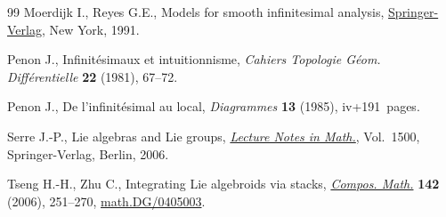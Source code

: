 \begin{thebibliography}{99}
Moerdijk I., Reyes G.E., Models for smooth inf\/initesimal analysis,
 \href{https://doi.org/10.1007/978-1-4757-4143-8}{Springer-Verlag}, New York, 1991.

Penon J., Inf\/init\'esimaux et intuitionnisme, \textit{Cahiers Topologie G\'eom.
 Diff\'erentielle} \textbf{22} (1981), 67--72.

Penon J., De l'inf\/init\'esimal au local, \textit{Diagrammes} \textbf{13}
 (1985), iv+191~pages.

Serre J.-P., Lie algebras and {L}ie groups, \href{https://doi.org/10.1007/978-3-540-70634-2}{\textit{Lecture Notes in Math.}},
 Vol.~1500, Springer-Verlag, Berlin, 2006.

Tseng H.-H., Zhu C., Integrating {L}ie algebroids via stacks, \href{https://doi.org/10.1112/S0010437X05001752}{\textit{Compos.
 Math.}} \textbf{142} (2006), 251--270, \href{http://arxiv.org/abs/math.DG/0405003}{math.DG/0405003}.

\end{thebibliography}
